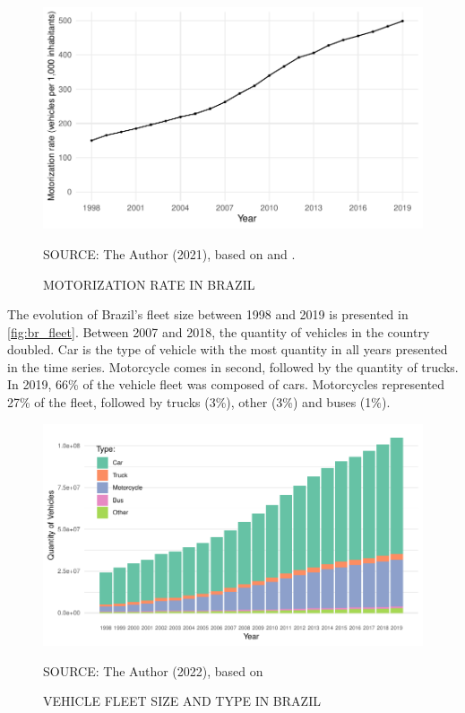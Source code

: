 
\begin{figure}[!htbp]
    \centering\footnotesize
    \captionsetup{font=footnotesize}
    \caption{MOTORIZATION RATE IN BRAZIL}
    \includegraphics{fig/brazil_motor.pdf}
    \label{fig:br_motor}
    \par SOURCE: The Author (2021), based on \textcite{MinistryofHealth2021} and \textcite{DENATRAN2020}.
\end{figure} 

The evolution of Brazil's fleet size between 1998 and 2019 is presented in \autoref{fig:br_fleet}. Between 2007 and 2018, the quantity of vehicles in the country doubled. Car is the type of vehicle with the most quantity in all years presented in the time series. Motorcycle comes in second, followed by the quantity of trucks. In 2019, 66\% of the vehicle fleet was composed of cars. Motorcycles represented 27\% of the fleet, followed by trucks (3\%), other (3\%) and buses (1\%). 

\begin{figure}[!htbp]
    \centering\footnotesize
    \captionsetup{font=footnotesize}
    \caption{VEHICLE FLEET SIZE AND TYPE IN BRAZIL}
    \includegraphics{fig/brazil_fleet_type.pdf}
    \label{fig:br_fleet}
    \par SOURCE: The Author (2022), based on \textcite{DENATRAN2020}
\end{figure}


